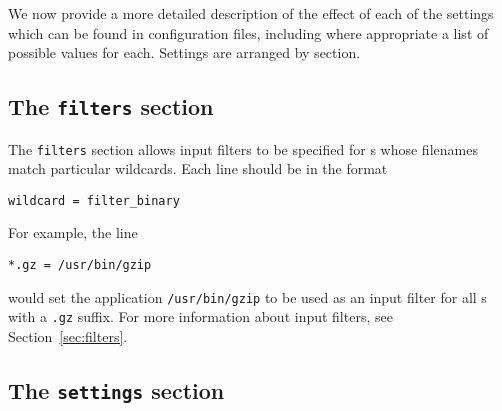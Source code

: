 We now provide a more detailed description of the effect of each of the
settings which can be found in configuration files, including where appropriate
a list of possible values for each. Settings are arranged by section.

\subsection{The {\tt filters} section}

The {\tt filters} section allows input filters to be specified for \datafile s
whose filenames match particular wildcards. Each line should be in the format
\begin{verbatim}
wildcard = filter_binary
\end{verbatim}
For example, the line
\begin{verbatim}
*.gz = /usr/bin/gzip
\end{verbatim}
would set the application {\tt /usr/bin/gzip} to be used as an input filter for
all \datafile s with a {\tt .gz} suffix. For more information about input
filters, see Section~\ref{sec:filters}.

\subsection{The {\tt settings} section}
\label{sec:configfile_settings}

